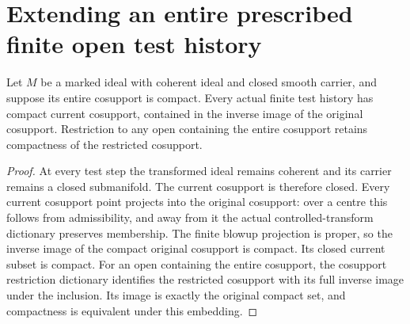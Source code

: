 \section{Extending an entire prescribed finite open test history}

\begin{lemma}
\label{hir:compact-cosupport-current-and-open}
\leanok
Let $M$ be a marked ideal with coherent ideal and closed smooth carrier, and suppose its entire cosupport is compact. Every actual finite test history has compact current cosupport, contained in the inverse image of the original cosupport. Restriction to any open containing the entire cosupport retains compactness of the restricted cosupport.
\end{lemma}
\begin{proof}
At every test step the transformed ideal remains coherent and its carrier remains a closed submanifold. The current cosupport is therefore closed. Every current cosupport point projects into the original cosupport: over a centre this follows from admissibility, and away from it the actual controlled-transform dictionary preserves membership. The finite blowup projection is proper, so the inverse image of the compact original cosupport is compact. Its closed current subset is compact. For an open containing the entire cosupport, the cosupport restriction dictionary identifies the restricted cosupport with its full inverse image under the inclusion. Its image is exactly the original compact set, and compactness is equivalent under this embedding.
\end{proof}

